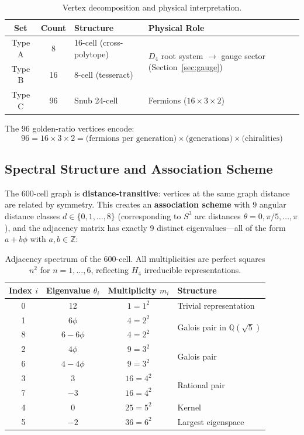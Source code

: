 \documentclass[12pt,a4paper]{article}
\begin{document}
\begin{table}[H]
\centering
\begin{tabular}{ccll}
\toprule
\textbf{Set} & \textbf{Count} & \textbf{Structure} & \textbf{Physical Role} \\
\midrule
Type A & 8 & 16-cell (cross-polytope) & \multirow{2}{*}{$D_4$ root system $\to$ gauge sector (Section~\ref{sec:gauge})} \\
Type B & 16 & 8-cell (tesseract) & \\
Type C & 96 & Snub 24-cell & Fermions ($16 \times 3 \times 2$) \\
\bottomrule
\end{tabular}
\caption{Vertex decomposition and physical interpretation.}
\end{table}

The 96 golden-ratio vertices encode:
\begin{equation}
96 = 16 \times 3 \times 2 = \text{(fermions per generation)} \times \text{(generations)} \times \text{(chiralities)}
\end{equation}

\subsection{Spectral Structure and Association Scheme}
\label{sec:spectral}

The 600-cell graph is \textbf{distance-transitive}: vertices at the same graph distance are related by symmetry. This creates an \textbf{association scheme} with 9 angular distance classes $d \in \{0, 1, \ldots, 8\}$ (corresponding to $S^3$ arc distances $\theta = 0, \pi/5, \ldots, \pi$), and the adjacency matrix has exactly 9 distinct eigenvalues---all of the form $a + b\phi$ with $a,b \in \mathbb{Z}$:

\begin{table}[H]
\centering
\begin{tabular}{cccl}
\toprule
\textbf{Index} $i$ & \textbf{Eigenvalue} $\theta_i$ & \textbf{Multiplicity} $m_i$ & \textbf{Structure} \\
\midrule
0 & 12             & $1 = 1^2$   & Trivial representation \\
1 & $6\phi$        & $4 = 2^2$   & \multirow{2}{*}{Galois pair in $\mathbb{Q}(\sqrt{5})$} \\
8 & $6 - 6\phi$    & $4 = 2^2$   & \\
2 & $4\phi$        & $9 = 3^2$   & \multirow{2}{*}{Galois pair} \\
6 & $4 - 4\phi$    & $9 = 3^2$   & \\
3 & 3              & $16 = 4^2$  & \multirow{2}{*}{Rational pair} \\
7 & $-3$           & $16 = 4^2$  & \\
4 & 0              & $25 = 5^2$  & Kernel \\
5 & $-2$           & $36 = 6^2$  & Largest eigenspace \\
\bottomrule
\end{tabular}
\caption{Adjacency spectrum of the 600-cell. All multiplicities are perfect squares $n^2$ for $n = 1, \ldots, 6$, reflecting $H_4$ irreducible representations.}
\label{tab:spectrum}
\end{table}
\end{document}

